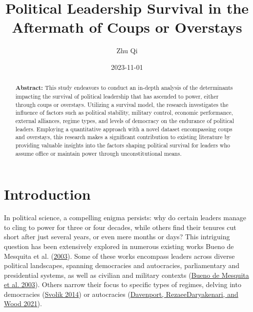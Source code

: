 \documentclass[
  12pt,
  a4paper,
  DIV=11,
  numbers=noendperiod]{scrartcl}
\title{Political Leadership Survival in the Aftermath of Coups or
Overstays}
\author{Zhu Qi}
\date{2023-11-01}
\begin{document}
\maketitle
\begin{abstract}
\textbf{Abstract:} This study endeavors to conduct an in-depth analysis
of the determinants impacting the survival of political leadership that
has ascended to power, either through coups or overstays. Utilizing a
survival model, the research investigates the influence of factors such
as political stability, military control, economic performance, external
alliances, regime types, and levels of democracy on the endurance of
political leaders. Employing a quantitative approach with a novel
dataset encompassing coups and overstays, this research makes a
significant contribution to existing literature by providing valuable
insights into the factors shaping political survival for leaders who
assume office or maintain power through unconstitutional means.
\end{abstract}
\ifdefined\Shaded\renewenvironment{Shaded}{\begin{tcolorbox}[enhanced, boxrule=0pt, breakable, borderline west={3pt}{0pt}{shadecolor}, interior hidden, frame hidden, sharp corners]}{\end{tcolorbox}}\fi

\hypertarget{introduction}{%
\section{Introduction}\label{introduction}}

In political science, a compelling enigma persists: why do certain
leaders manage to cling to power for three or four decades, while others
find their tenures cut short after just several years, or even mere
months or days? This intriguing question has been extensively explored
in numerous existing works Bueno de Mesquita et al.
(\protect\hyperlink{ref-buenodemesquita2003}{2003}). Some of these works
encompass leaders across diverse political landscapes, spanning
democracies and autocracies, parliamentary and presidential systems, as
well as civilian and military contexts
(\protect\hyperlink{ref-buenodemesquita2003}{Bueno de Mesquita et al.
2003}). Others narrow their focus to specific types of regimes, delving
into democracies (\protect\hyperlink{ref-svolik2014}{Svolik 2014}) or
autocracies (\protect\hyperlink{ref-davenport2021}{Davenport,
RezaeeDaryakenari, and Wood 2021}).
\end{document}
